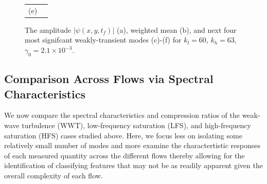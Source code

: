 \documentclass[a4paper,11pt]{article}
\begin{document}
\begin{figure}[!ht]
\begin{tabular}{cc}
(e) & 
\end{tabular}
\caption{The amplitude $\left|\psi(x,y,t_{f})\right|$ (a), weighted mean (b), and next four most signifcant weakly-transient modes (c)-(f) for $k_{l}=60$, $k_{h}=63$, $\gamma_{0}=2.1\times 10^{-3}$. }
\label{fig:ampcomphf}
\end{figure}

\subsection*{Comparison Across Flows via Spectral Characteristics}
We now compare the spectral characteristics and compression ratios of the weak-wave turbulence (WWT), low-frequency saturation (LFS), and high-frequency saturation (HFS) cases studied above.  Here, we focus less on isolating some relatively small number of modes and more examine the charactertistic responses of each measured quantity across the different flows thereby allowing for the identification of classifying features that may not be as readily apparent given the overall complexity of each flow.  
\end{document}
